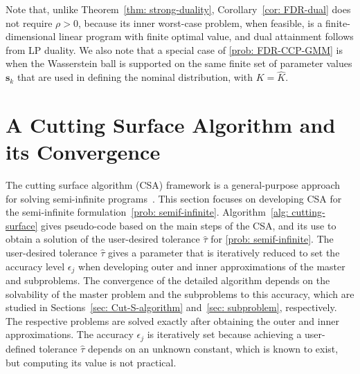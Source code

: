 \documentclass[opre,sglanonrev]{informs4}
\newcommand{\bs}{\bm{s}}
\begin{document}
{Note that, unlike Theorem~\ref{thm: strong-duality},
Corollary~\ref{cor: FDR-dual} does not require \(\rho>0\), because its inner
worst-case problem, when feasible, is a finite-dimensional linear program with
finite optimal value, and dual attainment follows from LP duality. We also note that a special case of \eqref{prob: FDR-CCP-GMM} is when the Wasserstein ball is supported on the same finite set of parameter values $\bs_k$ that are used in defining the nominal distribution, with $K=\hat{K}$.


\section{A Cutting Surface Algorithm and its Convergence}\label{sec: Dual-formulation}

The cutting surface algorithm (CSA) framework is a general-purpose approach for solving semi-infinite programs~\cite{hettich1993semi, reemtsen1998sip, goberna2001semi, mehrotra2014cutting, luo2019decomposition}. This section focuses on developing CSA for the semi-infinite formulation~\eqref{prob: semif-infinite}. Algorithm~\ref{alg: cutting-surface} gives pseudo-code based on the main steps of the CSA, and its use to obtain a solution of the user-desired tolerance $\hat{\tau}$ for \eqref{prob: semif-infinite}. The user-desired tolerance $\hat{\tau}$ gives a parameter that is iteratively reduced to set the accuracy level $\epsilon_j$ when developing outer and inner approximations of the master and subproblems. The convergence of the detailed algorithm depends on the solvability of the master problem and the subproblems to this accuracy, which are studied in Sections~\ref{sec: Cut-S-algorithm} and~\ref{sec: subproblem}, respectively. The respective problems are solved exactly after obtaining the outer and inner approximations. The accuracy $\epsilon_j$ is iteratively set because achieving a user-defined tolerance $\hat{\tau}$ depends on an unknown constant, which is known to exist, but computing its value is not practical. 

}
\end{document}
